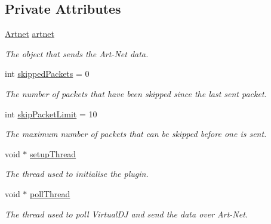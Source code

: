 \subsection*{Private Attributes}
\begin{DoxyCompactItemize}
\item 
\mbox{\label{classCVDJartnet_a1cbe7b41ac0c19c24743d23e377888c1}} 
\hyperlink{classArtnet}{Artnet} \hyperlink{classCVDJartnet_a1cbe7b41ac0c19c24743d23e377888c1}{artnet}
\begin{DoxyCompactList}\small\item\em The object that sends the Art-\/\+Net data. \end{DoxyCompactList}\item 
\mbox{\label{classCVDJartnet_a61ed7725b775d516e9f34e3ed9113d62}} 
int \hyperlink{classCVDJartnet_a61ed7725b775d516e9f34e3ed9113d62}{skipped\+Packets} = 0
\begin{DoxyCompactList}\small\item\em The number of packets that have been skipped since the last sent packet. \end{DoxyCompactList}\item 
\mbox{\label{classCVDJartnet_abbc42ef43456cdbd170ed46118fced1b}} 
int \hyperlink{classCVDJartnet_abbc42ef43456cdbd170ed46118fced1b}{skip\+Packet\+Limit} = 10
\begin{DoxyCompactList}\small\item\em The maximum number of packets that can be skipped before one is sent. \end{DoxyCompactList}\item 
void $\ast$ \hyperlink{classCVDJartnet_ae1b2c37bca6832820d7a6cd9df718d02}{setup\+Thread}
\begin{DoxyCompactList}\small\item\em The thread used to initialise the plugin. \end{DoxyCompactList}\item 
void $\ast$ \hyperlink{classCVDJartnet_adef23f780e10ff58e5b24aedde084489}{poll\+Thread}
\begin{DoxyCompactList}\small\item\em The thread used to poll Virtual\+DJ and send the data over Art-\/\+Net. \end{DoxyCompactList}\end{DoxyCompactItemize}


